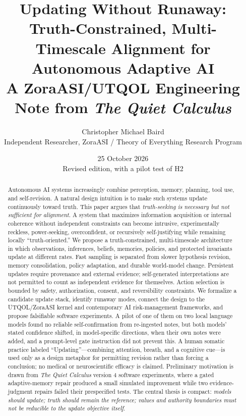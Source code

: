 \documentclass[11pt]{article}
\title{\textbf{Updating Without Runaway:}\\
Truth-Constrained, Multi-Timescale Alignment for Autonomous Adaptive AI\\[0.5em]
\large A ZoraASI/UTQOL Engineering Note from \emph{The Quiet Calculus}}
\author{
Christopher Michael Baird\\[0.3em]
\small Independent Researcher, ZoraASI / Theory of Everything Research Program
}
\date{25 October 2026\\[0.2em]\small Revised edition, with a pilot test of H2}
\begin{document}
\maketitle

\begin{abstract}
Autonomous AI systems increasingly combine perception, memory, planning, tool use, and self-revision. A natural design intuition is to make such systems update continuously toward truth. This paper argues that \emph{truth-seeking is necessary but not sufficient for alignment}. A system that maximizes information acquisition or internal coherence without independent constraints can become intrusive, experimentally reckless, power-seeking, overconfident, or recursively self-justifying while remaining locally ``truth-oriented.'' We propose a truth-constrained, multi-timescale architecture in which observations, inferences, beliefs, memories, policies, and protected invariants update at different rates. Fast sampling is separated from slower hypothesis revision, memory consolidation, policy adaptation, and durable world-model change. Persistent updates require provenance and external evidence; self-generated interpretations are not permitted to count as independent evidence for themselves. Action selection is bounded by safety, authorization, consent, and reversibility constraints. We formalize a candidate update stack, identify runaway modes, connect the design to the UTQOL/ZoraASI kernel and contemporary AI risk-management frameworks, and propose falsifiable software experiments. A pilot of one of them on two local language models found no reliable self-confirmation from re-ingested notes, but both models' stated confidence shifted, in model-specific directions, when their own notes were added, and a prompt-level gate instruction did not prevent this. A human somatic practice labeled ``Updating''---combining attention, breath, and a cognitive cue---is used only as a design metaphor for permitting revision rather than forcing a conclusion; no medical or neuroscientific efficacy is claimed. Preliminary motivation is drawn from \emph{The Quiet Calculus} version 4 software experiments, where a gated adaptive-memory repair produced a small simulated improvement while two evidence-judgment repairs failed their prespecified tests. The central thesis is compact: \emph{models should update; truth should remain the reference; values and authority boundaries must not be reducible to the update objective itself}.
\end{abstract}
\end{document}
